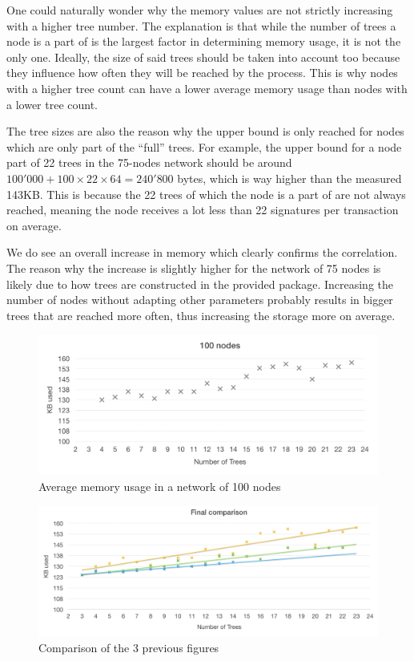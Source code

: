 \documentclass[11pt, a4paper, twoside, openright]{article}
\begin{document}
One could naturally wonder why the memory values are not strictly increasing with a higher tree number. The explanation is that while the number of trees a node is a part of is the largest factor in determining memory usage, it is not the only one. Ideally, the size of said trees should be taken into account too because they influence how often they will be reached by the process. This is why nodes with a higher tree count can have a lower average memory usage than nodes with a lower tree count.

The tree sizes are also the reason why the upper bound is only reached for nodes which are only part of the ``full'' trees. For example, the upper bound for a node part of 22 trees in the 75-nodes network should be around $100'000 + 100 \times 22 \times 64 = 240'800$ bytes, which is way higher than the measured
143KB. This is because the 22 trees of which the node is a part of are not always reached, meaning the node receives a lot less than 22 signatures per transaction on average.

We do see an overall increase in memory which clearly confirms the correlation. The reason why the increase is slightly higher for the network of 75 nodes is likely due to how trees are constructed in the  provided package. Increasing the number of nodes without adapting other parameters probably results in bigger trees that are reached more often, thus increasing the storage more on average.

\begin{figure}[htbp]
 \centering
  \includegraphics[width=\textwidth]{100graph.png}
  \caption{Average memory usage in a network of 100 nodes}
\end{figure}

\begin{figure}[htbp]
 \centering
  \includegraphics[width=\textwidth]{all3graph.png}
  \caption{Comparison of the 3 previous figures}
\end{figure}
\end{document}
